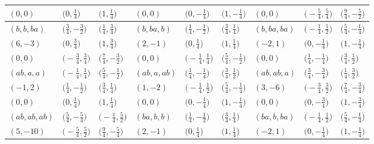 \documentclass[pdftex]{sigma}
\theoremstyle{definition}
\numberwithin{equation}{section}
\begin{document}
\begin{landscape}
\begin{table}[th]
\begin{tabular}{|lll|lll|lll|}
\\
$(0, 0)$ & $\bigl(0, \frac{1}{4}\bigr)$ & $\bigl(1, \frac{1}{4}\bigr)$ & $(0, 0)$ & $\bigl(0, -\frac{1}{4}\bigr)$ & $\bigl(1, -\frac{1}{4}\bigr)$ & $(0, 0)$ & $\bigl(-\frac{5}{4}, \frac{5}{4}\bigr)$ & $\bigl(\frac{9}{4}, -\frac{5}{2}\bigr)$
\\\hline
$(b, b, ba)$ & $\bigl(\frac{3}{4}, -\frac{3}{2}\bigr)$ & $\bigl(\frac{1}{4}, \frac{3}{4}\bigr)$ & $(b, ba, b)$ & $\bigl(\frac{1}{4}, -\frac{1}{2}\bigr)$ & $\bigl(\frac{3}{4}, \frac{1}{4}\bigr)$ & $(b, ba, ba)$ & $\bigl(-\frac{1}{4}, \frac{1}{2}\bigr)$ & $\bigl(\frac{5}{4}, -\frac{1}{4}\bigr)$
\\
$(6, -3)$ & $\bigl(0, \frac{3}{4}\bigr)$ & $\bigl(1, \frac{3}{4}\bigr)$ & $(2, -1)$ & $\bigl(0, \frac{1}{4}\bigr)$ & $\bigl(1, \frac{1}{4}\bigr)$ & $(-2, 1)$ & $\bigl(0, -\frac{1}{4}\bigr)$ & $\bigl(1, -\frac{1}{4}\bigr)$
\\
$(0, 0)$ & $\bigl(-\frac{3}{4}, \frac{3}{4}\bigr)$ & $\bigl(\frac{7}{4}, -\frac{3}{2}\bigr)$ & $(0, 0)$ & $\bigl(-\frac{1}{4}, \frac{1}{4}\bigr)$ & $\bigl(\frac{5}{4}, -\frac{1}{2}\bigr)$ & $(0, 0)$ & $\bigl(\frac{1}{4}, -\frac{1}{4}\bigr)$ & $\bigl(\frac{3}{4}, \frac{1}{2}\bigr)$
\\\hline
$(ab, a, a)$ & $\bigl(-\frac{1}{4}, \frac{1}{4}\bigr)$ & $\bigl(\frac{5}{4}, -\frac{1}{2}\bigr)$ & $(ab, a, ab)$ & $\bigl(\frac{1}{4}, -\frac{1}{4}\bigr)$ & $\bigl(\frac{3}{4}, \frac{1}{2}\bigr)$ & $(ab, ab, a)$ & $\bigl(\frac{3}{4}, -\frac{3}{4}\bigr)$ & $\bigl(\frac{1}{4}, \frac{3}{2}\bigr)$
\\
$(-1, 2)$ & $\bigl(\frac{1}{4}, -\frac{1}{2}\bigr)$ & $\bigl(\frac{3}{4}, \frac{1}{4}\bigr)$ & $(1, -2)$ & $\bigl(-\frac{1}{4}, \frac{1}{2}\bigr)$ & $\bigl(\frac{5}{4}, -\frac{1}{4}\bigr)$ & $(3, -6)$ & $\bigl(-\frac{3}{4}, \frac{3}{2}\bigr)$ & $\bigl(\frac{7}{4}, -\frac{3}{4}\bigr)$
\\
$(0, 0)$ & $\bigl(0, \frac{1}{4}\bigr)$ & $\bigl(1, \frac{1}{4}\bigr)$ & $(0, 0)$ & $\bigl(0, -\frac{1}{4}\bigr)$ & $\bigl(1, -\frac{1}{4}\bigr)$ & $(0, 0)$ & $\bigl(0, -\frac{3}{4}\bigr)$ & $\bigl(1, -\frac{3}{4}\bigr)$
\\\hline
$(ab, ab, ab)$ & $\bigl(\frac{5}{4}, -\frac{5}{4}\bigr)$ & $\bigl(-\frac{1}{4}, \frac{5}{2}\bigr)$ & $(ba, b, b)$ & $\bigl(\frac{1}{4}, -\frac{1}{2}\bigr)$ & $\bigl(\frac{3}{4}, \frac{1}{4}\bigr)$ & $(ba, b, ba)$ & $\bigl(-\frac{1}{4}, \frac{1}{2}\bigr)$ & $\bigl(\frac{5}{4}, -\frac{1}{4}\bigr)$
\\
$(5, -10)$ & $\bigl(-\frac{5}{4}, \frac{5}{2}\bigr)$ & $\bigl(\frac{9}{4}, -\frac{5}{4}\bigr)$ & $(2, -1)$ & $\bigl(0, \frac{1}{4}\bigr)$ & $\bigl(1, \frac{1}{4}\bigr)$ & $(-2, 1)$ & $\bigl(0, -\frac{1}{4}\bigr)$ & $\bigl(1, -\frac{1}{4}\bigr)$

\end{tabular}
\end{table}
\end{landscape}
\end{document}

